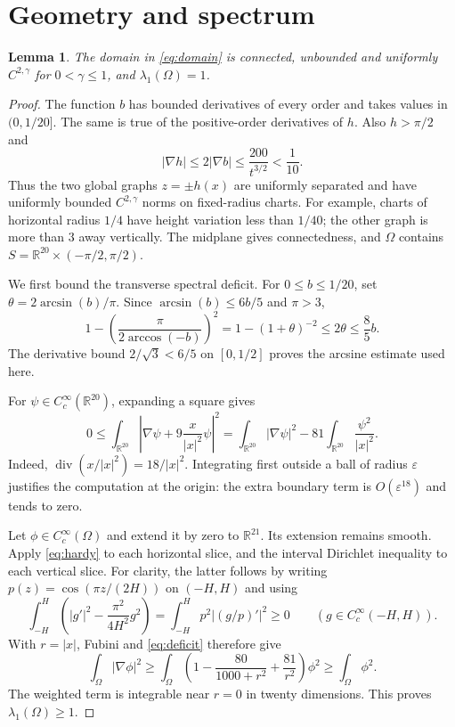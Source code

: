 \documentclass[11pt,a4paper]{article}
\newtheorem{lemma}[theorem]{Lemma}
\newcommand{\R}{\mathbb R}
\newcommand{\Om}{\Omega}
\begin{document}
\section{Geometry and spectrum}
\begin{lemma}\label{lem:spectrum}
The domain in \eqref{eq:domain} is connected, unbounded and uniformly
$C^{2,\gamma}$ for $0<\gamma\le1$, and $\lambda_1(\Om)=1$.
\end{lemma}
\begin{proof}
The function $b$ has bounded derivatives of every order and takes values in
$(0,1/20]$. The same is true of the positive-order derivatives of $h$.
Also $h>\pi/2$ and
\[
 |\nabla h|\le2|\nabla b|\le\frac{200}{t^{3/2}}<\frac1{10}.
\]
Thus the two global graphs $z=\pm h(x)$ are uniformly separated and have
uniformly bounded $C^{2,\gamma}$ norms on fixed-radius charts. For example,
charts of horizontal radius $1/4$ have height variation less than $1/40$;
the other graph is more than $3$ away vertically. The midplane gives
connectedness, and $\Om$ contains
$S=\R^{20}\times(-\pi/2,\pi/2)$.

We first bound the transverse spectral deficit. For $0\le b\le1/20$, set
$\theta=2\arcsin(b)/\pi$. Since
$\arcsin(b)\le6b/5$ and $\pi>3$,
\begin{equation}\label{eq:deficit}
 1-\left(\frac{\pi}{2\arccos(-b)}\right)^2
 =1-(1+\theta)^{-2}\le2\theta\le\frac85 b.
\end{equation}
The derivative bound $2/\sqrt3<6/5$ on $[0,1/2]$ proves the arcsine
estimate used here.

For $\psi\in C_c^\infty(\R^{20})$, expanding a square gives
\begin{equation}\label{eq:hardy}
 0\le\int_{\R^{20}}\left|\nabla\psi+9\frac{x}{|x|^2}\psi\right|^2
 =\int_{\R^{20}}|\nabla\psi|^2
   -81\int_{\R^{20}}\frac{\psi^2}{|x|^2}.
\end{equation}
Indeed, $\operatorname{div}(x/|x|^2)=18/|x|^2$. Integrating first outside
a ball of radius $\varepsilon$ justifies the computation at the origin:
the extra boundary term is $O(\varepsilon^{18})$ and tends to zero.

Let $\phi\in C_c^\infty(\Om)$ and extend it by zero to $\R^{21}$. Its
extension remains smooth. Apply \eqref{eq:hardy} to each horizontal slice,
and the interval Dirichlet inequality to each vertical slice. For clarity,
the latter follows by writing $p(z)=\cos(\pi z/(2H))$ on $(-H,H)$ and using
\[
 \int_{-H}^H\left(|g'|^2-\frac{\pi^2}{4H^2}g^2\right)
 =\int_{-H}^H p^2\left|(g/p)'\right|^2\ge0
 \qquad(g\in C_c^\infty(-H,H)).
\]
With $r=|x|$, Fubini and \eqref{eq:deficit} therefore give
\begin{equation}\label{eq:lower-spectrum}
 \int_\Om|\nabla\phi|^2
 \ge\int_\Om\left(1-\frac{80}{1000+r^2}+\frac{81}{r^2}\right)\phi^2
 \ge\int_\Om\phi^2.
\end{equation}
The weighted term is integrable near $r=0$ in twenty dimensions. This
proves $\lambda_1(\Om)\ge1$.


\end{proof}
\end{document}
